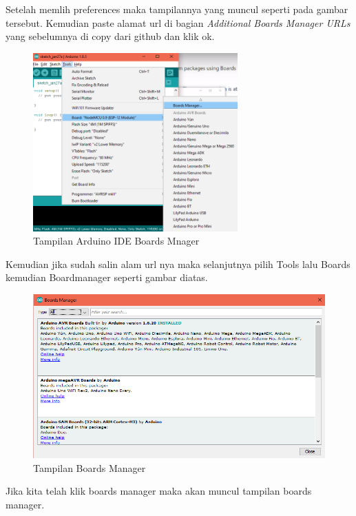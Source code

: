 \begin{enumerate}
    \par Setelah memlih preferences maka tampilannya yang muncul seperti pada gambar tersebut. Kemudian paste alamat url di bagian \textit{Additional Boards Manager URLs} yang sebelumnya di copy dari github dan klik ok.
    \begin{figure}[H]
    \centering
    \includegraphics[width=0.7\textwidth]{figures/managerboar.png}
    \caption{Tampilan Arduino IDE Boards Mnager}
    \label{print}
    \end{figure}
    
    \par Kemudian jika sudah salin alam url nya maka selanjutnya pilih Tools lalu Boards kemudian Boardmanager seperti gambar diatas.
    
    \begin{figure}[H]
    \centering
    \includegraphics[width=1\textwidth]{figures/manager5.png}
    \caption{Tampilan Boards Manager}
    \label{print}
    \end{figure}
    \par Jika kita telah klik boards manager maka akan muncul tampilan boards manager.
    

\end{enumerate}

